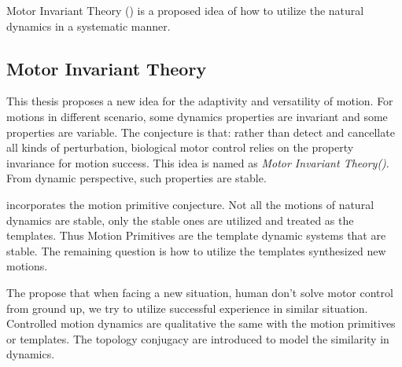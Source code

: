Motor Invariant Theory (\moit) is a proposed idea of how to utilize the natural dynamics in a systematic manner.








\subsection{Motor Invariant Theory}
%
%
%





This thesis proposes a new idea for the adaptivity and versatility of motion.
For motions in different scenario, some dynamics properties are invariant and some properties are variable.
The conjecture is that: rather than detect and cancellate all kinds of perturbation, biological motor control relies on the property invariance for motion success.
This idea is named as \emph{Motor Invariant Theory(\moit)}.
From dynamic perspective, such properties are stable.

\moit incorporates the motion primitive conjecture. 
Not all the motions of natural dynamics are stable, only the stable ones are utilized and treated as the templates.
Thus Motion Primitives are the template dynamic systems that are stable.
The remaining question is how to utilize the templates synthesized new motions.

The \moit propose that when facing a new situation, human don't solve motor control from ground up,
we try to utilize  successful experience in similar situation.
Controlled motion dynamics are qualitative the same with the motion primitives or templates.
The topology conjugacy are introduced to model the similarity in dynamics.

